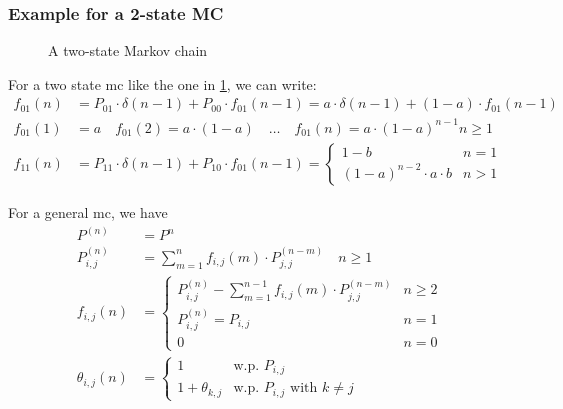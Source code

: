\subsubsection{Example for a 2-state MC}
\begin{figure}
	\centering
	\caption{A two-state Markov chain}
	\label{fig:2sMC}
\end{figure}
For a two state \gls{mc} like the one in \ref{fig:2sMC}, we can write:
\begin{equation}\begin{split}
	f_{01}(n)&= P_{01} \cdot \delta(n-1) + P_{00} \cdot f_{01}(n-1) = a \cdot \delta(n-1) + (1-a)\cdot f_{01}(n-1)\\
	f_{01}(1)&=a \quad f_{01}(2)=a \cdot(1-a) \quad \dots \quad f_{01}(n) = a\cdot(1-a)^{n-1} n \ge 1 \\
	f_{11}(n) &= P_{11}\cdot \delta(n-1) + P_{10} \cdot f_{01}(n-1) =
	\begin{cases}
		1-b & n=1 \\ (1-a)^{n-2}\cdot a \cdot b & n>1
	\end{cases}
\end{split}\end{equation}

For a general \gls{mc}, we have
\begin{equation}\begin{split}
	P^{(n)} &= P^n \\
	P_{i,j}^{(n)} &= \sum\limits_{m=1}^n f_{i,j}(m) \cdot P_{j,j}^{(n-m)} \quad n \ge 1 \\
	f_{i,j}(n)&=
	\begin{cases}
		P_{i,j}^{(n)} -\sum\limits_{m=1}^{n-1} f_{i,j}(m) \cdot P_{j,j}^{(n-m)} & n \ge 2 \\
		P_{i,j}^{(n)} = P_{i,j} & n =1 \\
		0 & n=0
	\end{cases} \\
	\theta_{i,j}(n)&=
	\begin{cases}
		1 & \text{w.p. } P_{i,j} \\
		1+\theta_{k,j} &  \text{w.p. } P_{i,j} \text{ with } k \neq j
	\end{cases} \\
\end{split}\end{equation}

